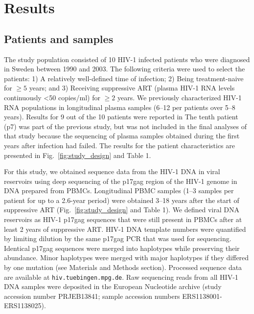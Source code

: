 \documentclass[aps,rmp,onecolumn,linenumbers]{revtex4-1}
\newcommand{\FIG}[1]{Fig.~\ref{fig:#1}}
\begin{document}
\section*{Results}

\subsection*{Patients and samples} 
The study population consisted of 10 HIV-1 infected patients who were diagnosed in Sweden between 1990 and 2003. The following criteria were used to select the patients: 1) A relatively well-defined time of infection; 2) Being treatment-naive for $\geq 5$ years; and 3) Receiving suppressive ART (plasma HIV-1 RNA levels continuously \textless 50 copies/ml) for $≥2$ years. 
We previously characterized HIV-1 RNA populations in longitudinal plasma samples (6--12 per patients over 5–8 years). 
Results for 9 out of the 10 patients were reported in \cite{zanini_population_2016}
The tenth patient (p7) was part of the previous study, but was not included in the final analyses of that study because the sequencing of plasma samples obtained during the first years after infection had failed. The results for the patient characteristics are presented in \FIG{study_design} and Table 1. 

For this study, we obtained sequence data from the HIV-1 DNA in viral reservoirs using deep sequencing of the p17gag region of the HIV-1 genome in DNA prepared from PBMCs. Longitudinal PBMC samples (1--3 samples per patient for up to a 2.6-year period) were obtained 3--18 years after the start of suppressive ART (\FIG{study_design} and Table 1). We defined viral DNA reservoirs as HIV-1 p17gag sequences that were still present in PBMCs after at least 2 years of suppressive ART. HIV-1 DNA template numbers were quantified by limiting dilution by the same p17gag PCR that was used for sequencing. Identical p17gag sequences were merged into haplotypes while preserving their abundance. Minor haplotypes were merged with major haplotypes if they differed by one mutation (see Materials and Methods section). Processed sequence data are available at \texttt{hiv.tuebingen.mpg.de}. Raw sequencing reads from all HIV-1 DNA samples were deposited in the European Nucleotide archive (study accession number PRJEB13841; sample accession numbers ERS1138001-ERS1138025).
\end{document}

